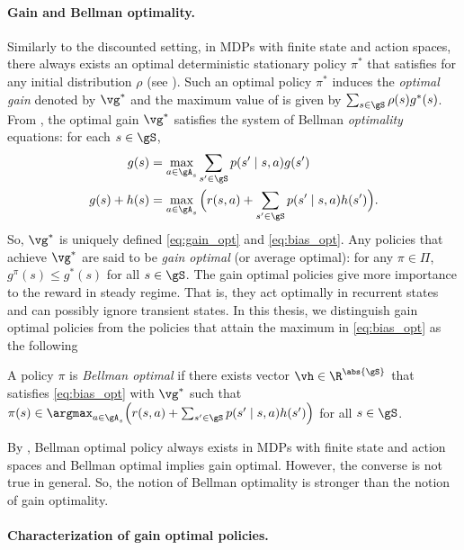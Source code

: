 \paragraph{Gain and Bellman optimality.}
Similarly to the discounted setting, in MDPs with finite state and action spaces, there always exists an optimal deterministic stationary policy $\pi^*$ that satisfies  for any initial distribution $\rho$ (see \cite[Theorem~9.1.8]{puterman2014markov}).
Such an optimal policy $\pi^*$ induces the \emph{optimal gain} denoted by $\vg^*$ and the maximum value of  is given by $\sum_{s\in\gS} \rho(s)g^*(s)$.
From \cite[Chapter~9]{puterman2014markov}, the optimal gain $\vg^*$ satisfies the system of Bellman \emph{optimality} equations: for each $s\in\gS$,
\begin{align}
    g(s) &= \max_{a\in\gA_s} \sum_{s'\in\gS}p(s'\mid s,a)g(s') \label{eq:gain_opt} \\
    g(s) +h(s) &= \max_{a\in\gA_s}\Big(r(s,a) +\sum_{s'\in\gS}p(s'\mid s,a)h(s')\Big) \label{eq:bias_opt}.
\end{align}
So, $\vg^*$ is uniquely defined \eqref{eq:gain_opt} and \eqref{eq:bias_opt}.
Any policies that achieve $\vg^*$ are said to be \emph{gain optimal} (or average optimal): for any $\pi\in\Pi$, $g^\pi(s)\le g^*(s)$ for all $s\in\gS$.
The gain optimal policies give more importance to the reward in steady regime. 
That is, they act optimally in recurrent states and can possibly ignore transient states.
In this thesis, we distinguish gain optimal policies from the policies that attain the maximum in \eqref{eq:bias_opt} as the following
\begin{defn}[Bellman optimal policy]
    A policy $\pi$ is \emph{Bellman optimal} if there exists vector $\vh\in\R^{\abs{\gS}}$ that satisfies \eqref{eq:bias_opt} with $\vg^*$ such that $\pi(s)\in\argmax_{a\in\gA_s}\Big(r(s,a) +\sum_{s'\in\gS}p(s'\mid s,a)h(s')\Big)$ for all $s\in\gS$.
\end{defn}
By \cite[Theorem~9.1.7]{puterman2014markov}, Bellman optimal policy always exists in MDPs with finite state and action spaces and Bellman optimal implies gain optimal.
However, the converse is not true in general.
So, the notion of Bellman optimality is stronger than the notion of gain optimality.

\paragraph{Characterization of gain optimal policies.}

